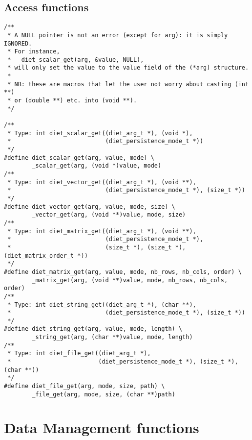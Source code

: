 \subsection{Access functions}
\label{sec:accessfun}
{\footnotesize
\begin{verbatim}
/**
 * A NULL pointer is not an error (except for arg): it is simply IGNORED.
 * For instance,
 *   diet_scalar_get(arg, &value, NULL),
 * will only set the value to the value field of the (*arg) structure.
 * 
 * NB: these are macros that let the user not worry about casting (int **)
 * or (double **) etc. into (void **).
 */

/**
 * Type: int diet_scalar_get((diet_arg_t *), (void *),
 *                           (diet_persistence_mode_t *))
 */
#define diet_scalar_get(arg, value, mode) \
        _scalar_get(arg, (void *)value, mode)
/**
 * Type: int diet_vector_get((diet_arg_t *), (void **),
 *                           (diet_persistence_mode_t *), (size_t *))
 */
#define diet_vector_get(arg, value, mode, size) \
        _vector_get(arg, (void **)value, mode, size)
/**
 * Type: int diet_matrix_get((diet_arg_t *), (void **),
 *                           (diet_persistence_mode_t *),
 *                           (size_t *), (size_t *), (diet_matrix_order_t *))
 */
#define diet_matrix_get(arg, value, mode, nb_rows, nb_cols, order) \
        _matrix_get(arg, (void **)value, mode, nb_rows, nb_cols, order)
/**
 * Type: int diet_string_get((diet_arg_t *), (char **),
 *                           (diet_persistence_mode_t *), (size_t *))
 */
#define diet_string_get(arg, value, mode, length) \
        _string_get(arg, (char **)value, mode, length)
/**
 * Type: int diet_file_get((diet_arg_t *),
 *                         (diet_persistence_mode_t *), (size_t *), (char **))
 */
#define diet_file_get(arg, mode, size, path) \
        _file_get(arg, mode, size, (char **)path)
\end{verbatim}
}


\section{Data Management functions}

